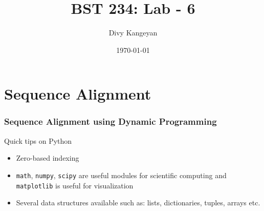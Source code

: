 \documentclass{beamer}
\title[BST 234]{BST 234: Lab - 6}
\author[Divy Kangeyan]{Divy Kangeyan}
\date{\today}
\begin{document}
	
	\begin{frame}
		\titlepage
	\end{frame}
	
	
\section{Sequence Alignment}

\begin{frame}
\frametitle{Sequence Alignment using Dynamic Programming}


Quick tips on Python

\begin{itemize}
\item Zero-based indexing
\item \texttt{math}, \texttt{numpy}, \texttt{scipy} are useful modules for scientific computing and \texttt{matplotlib} is useful for visualization
\item Several data structures available such as: lists, dictionaries, tuples, arrays etc. 
\end{itemize}


\begin{center}
\small

\normalsize
\end{center}

\begin{center}
\end{center}


\end{frame}
\end{document}
